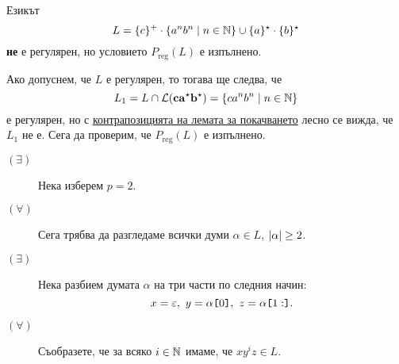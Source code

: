 \begin{example}
  Езикът
  \[L = \{c\}^+\cdot\{a^nb^n\mid n\in\mathbb{N}\}\cup \{a\}^\star \cdot \{b\}^\star\]
  {\bf не} е регулярен, но условието $P_{\text{reg}}(L)$ е изпълнено.
\end{example}
\begin{hint}
  Ако допуснем, че $L$ е регулярен, то тогава ще следва, че 
  \[L_1 = L\cap \mathcal{L}(\mathbf{ca^\star b^\star}) = \{ca^nb^n \mid n\in\mathbb{N}\}\]
  е регулярен, но с \hyperref[cor:regular:pumping]{контрапозицията на лемата за покачването} лесно се вижда, че $L_1$ не е. Сега да проверим, че $P_{\text{reg}}(L)$ е изпълнено. 
  \begin{description}
  \item[$(\exists)$]
    Нека изберем $p = 2$.
  \item[$(\forall)$]
    Сега трябва да разгледаме всички думи $\alpha \in L$, $\vert{\alpha}\vert \geq 2$.
  \item[$(\exists)$]
    Нека разбием думата $\alpha$ на три части по следния начин:
    \[x = \varepsilon,\ y = \alpha\texttt{[}{0}\texttt{]},\ z = \alpha\texttt{[}{1:}\texttt{]}.\]
  \item[$(\forall)$]
    Съобразете, че за всяко $i \in \mathbb{N}$ имаме, че $xy^iz \in L$.
  \end{description}
\end{hint}


